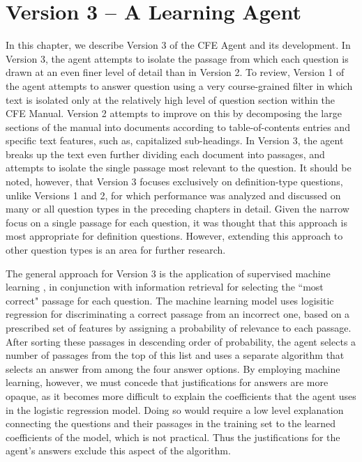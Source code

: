  
\chapter{Version 3 -- A Learning Agent}

In this chapter, we describe Version 3 of the CFE Agent and its development.  In Version 3, the agent attempts to isolate the passage from which each question is drawn at an even finer level of detail than in Version 2.  To review, Version 1 of the agent attempts to answer question using a very course-grained filter in which text is isolated only at the relatively high level of question section within the CFE Manual.  Version 2 attempts to improve on this by decomposing the large sections of the manual into documents according to table-of-contents entries and specific text features, such as, capitalized sub-headings.  In Version 3, the agent breaks up the text even further dividing each document into passages, and attempts to isolate the single passage most relevant to the question.  It should be noted, however, that Version 3 focuses exclusively on definition-type questions, unlike Versions 1 and 2, for which performance was analyzed and discussed on many or all question types in the preceding chapters in detail.  Given the narrow focus on a single passage for each question, it was thought that this approach is most appropriate for definition questions.  However, extending this approach to other question types is an area for further research.

The general approach for Version 3 is the application of supervised machine learning  \cite{alpaydin_2014_introduction_ch1}, in conjunction with information retrieval for selecting the ``most correct" passage for each question.  The machine learning model uses logisitic regression for discriminating a correct passage from an incorrect one, based on a prescribed set of features by assigning a probability of relevance to each passage.  After sorting these passages in descending order of probability, the agent selects a number of passages from the top of this list and uses a separate algorithm that selects an answer from among the four answer options.  By employing machine learning, however, we must concede that justifications for answers are more opaque, as it becomes more difficult to explain the coefficients that the agent uses in the logistic regression model.  Doing so would require a low level explanation connecting the questions and their passages in the training set to the learned coefficients of the model, which is not practical.  Thus the justifications for the agent's answers exclude this aspect of the algorithm.

